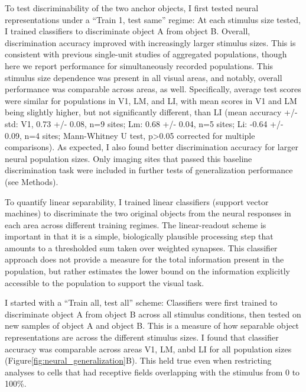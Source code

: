 To test discriminability of the two anchor objects, I first tested neural representations under a ``Train 1, test same'' regime: At each stimulus size tested, I trained classifiers to discriminate object A from object B. Overall, discrimination accuracy improved with increasingly larger stimulus sizes. This is consistent with previous single-unit studies of aggregated populations, though here we report performance for simultaneously recorded populations. This stimulus size dependence was present in all visual areas, and notably, overall performance was comparable across areas, as well. Specifically, average test scores were similar for populations in V1, LM, and LI, with mean scores in V1 and LM being slightly higher, but not significantly different, than LI (mean accuracy +/- std: V1, 0.73 +/- 0.08, n=9 sites; Lm: 0.68 +/- 0.04, n=5 sites; Li: -0.64 +/- 0.09, n=4 sites; Mann-Whitney U test, p>0.05 corrected for multiple comparisons). As expected, I also found better discrimination accuracy for larger neural population sizes. Only imaging sites that passed this baseline discrimination task were included in further tests of generalization performance (see Methods). 

To quantify linear separability, I trained linear classifiers (support vector machines) to discriminate the two original objects from the neural responses in each area across different training regimes. The linear-readout scheme is important in that it is a simple, biologically plausible processing step that amounts to a thresholded sum taken over weighted synapses. This classifier approach does not provide a measure for the total information present in the population, but rather estimates the lower bound on the information explicitly accessible to the population to support the visual task. 

I started with a ``Train all, test all'' scheme:  Classifiers were first trained to discriminate object A from object B across all stimulus conditions, then tested on new samples of object A and object B. This is a measure of how separable object representations are across the different stimulus sizes. I found that classifier accuracy was comparable across areas V1, LM, anbd LI for all population sizes (Figure\ref{fig:neural_generalization}B). This held true even when restricting analyses to cells that had receptive fields overlapping with the stimulus from 0 to 100\%. %


